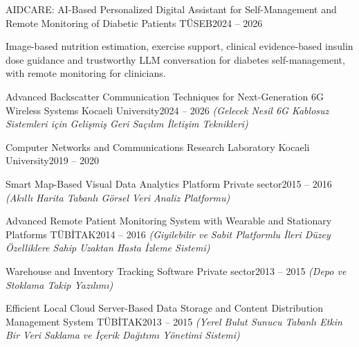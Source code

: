 
\begin{cventries}
    {AIDCARE: AI-Based Personalized Digital Assistant for Self-Management and Remote Monitoring of Diabetic Patients}
    {TÜSEB}{2024 -- 2026}
    {\begin{cvitems}
       \item Image-based nutrition estimation, exercise support, clinical evidence-based insulin dose guidance and trustworthy LLM conversation for diabetes self-management, with remote monitoring for clinicians.
     \end{cvitems}}

    {Advanced Backscatter Communication Techniques for Next-Generation 6G Wireless Systems}
    {Kocaeli University}{2024 -- 2026}
    {\textit{(Gelecek Nesil 6G Kablosuz Sistemleri için Gelişmiş Geri Saçılım İletişim Teknikleri)}}

    {Computer Networks and Communications Research Laboratory}
    {Kocaeli University}{2019 -- 2020}{}

    {Smart Map-Based Visual Data Analytics Platform}
    {Private sector}{2015 -- 2016}
    {\textit{(Akıllı Harita Tabanlı Görsel Veri Analiz Platformu)}}

    {Advanced Remote Patient Monitoring System with Wearable and Stationary Platforms}
    {TÜBİTAK}{2014 -- 2016}
    {\textit{(Giyilebilir ve Sabit Platformlu İleri Düzey Özelliklere Sahip Uzaktan Hasta İzleme Sistemi)}}

    {Warehouse and Inventory Tracking Software}
    {Private sector}{2013 -- 2015}
    {\textit{(Depo ve Stoklama Takip Yazılımı)}}

    {Efficient Local Cloud Server-Based Data Storage and Content Distribution Management System}
    {TÜBİTAK}{2013 -- 2015}
    {\textit{(Yerel Bulut Sunucu Tabanlı Etkin Bir Veri Saklama ve İçerik Dağıtımı Yönetimi Sistemi)}}


\end{cventries}

